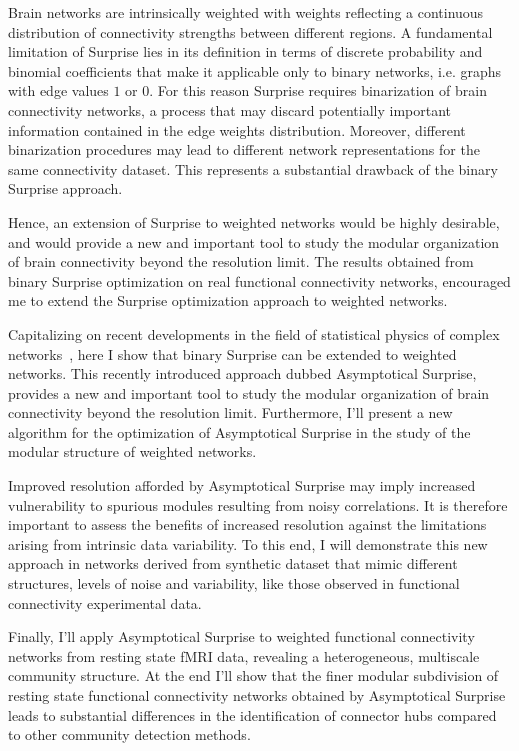 Brain networks are intrinsically weighted with weights reflecting a continuous distribution of connectivity strengths between different regions.
A fundamental limitation of Surprise lies in its definition in terms of discrete probability and binomial coefficients that make it applicable only to binary networks, i.e. graphs with edge values $1$ or $0$.
For this reason Surprise requires binarization of brain connectivity networks, a process that may discard potentially important information contained in the edge weights distribution. 
Moreover, different binarization procedures may lead to different network representations for the same connectivity dataset.
This represents a substantial drawback of the binary Surprise approach.

Hence, an extension of Surprise to weighted networks would be highly desirable, and would provide a new and important tool to study the modular organization of brain connectivity beyond the resolution limit.
The results obtained from binary Surprise optimization on real functional connectivity networks, encouraged me to extend the Surprise optimization approach to weighted networks.

Capitalizing on recent developments in the field of statistical physics of complex networks~\cite{traag2015}, here I show that binary Surprise can be extended to weighted networks.
This recently introduced approach dubbed Asymptotical Surprise, provides a new and important tool to study the modular organization of brain connectivity beyond the resolution limit.
Furthermore, I'll present a new algorithm for the optimization of Asymptotical Surprise in the study of the modular structure of weighted networks.

Improved resolution afforded by Asymptotical Surprise may imply increased vulnerability to spurious modules resulting from noisy correlations.
It is therefore important to assess the benefits of increased resolution against the limitations arising from intrinsic data variability. 
To this end, I will demonstrate this new approach in networks derived from synthetic dataset that mimic different structures, levels of noise and variability, like those observed in functional connectivity experimental data.

Finally, I'll apply Asymptotical Surprise to weighted functional connectivity networks from resting state fMRI data, revealing a heterogeneous, multiscale community structure. At the end I'll show that the finer modular subdivision of resting state functional connectivity networks obtained by Asymptotical Surprise leads to substantial differences in the identification of connector hubs compared to other community detection methods.

